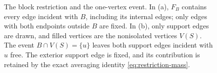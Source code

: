 \begin{figure}[tb]
\caption{The block restriction and the one-vertex event.
In (a), $F_B$ contains every edge incident with $B$, including its
internal edges; only edges with both endpoints outside $B$ are fixed.
In (b), only support edges are drawn, and filled vertices are the
nonisolated vertices $V(S)$.  The event $B\cap V(S)=\{u\}$ leaves
both support edges incident with $u$ free.  The exterior support
edge is fixed, and its contribution is retained by the exact
averaging identity \eqref{eq:restriction-mass}.}
\label{fig:block}
\end{figure}
